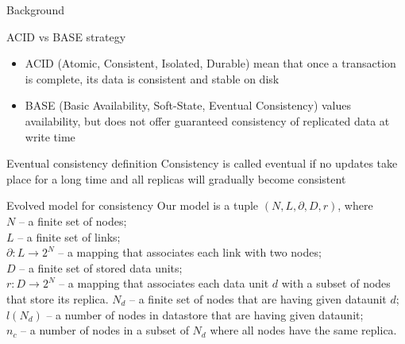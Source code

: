 \documentclass[aspectratio=43]{beamer}
\begin{document}
\begin{frame}{Background}
\begin{block}{ACID vs BASE strategy}
\begin{itemize}
\item ACID (Atomic, Consistent, Isolated, Durable) mean that once a transaction is complete, its data is consistent and stable on disk
\item BASE (Basic Availability, Soft-State, Eventual Consistency) values availability, but 
does not offer guaranteed consistency of replicated data at write time
\end{itemize}

\end{block}

\begin{block}{Eventual consistency definition}
Consistency is called eventual if no updates
take place for a long time and all replicas will gradually become consistent
\end{block}

\end{frame}

\begin{frame}{Evolved model for consistency}
Our model is a tuple $(N, L, \partial,D, r)$, where \\

$N$ -- a finite set of nodes; \\
$L$ -- a finite set of links; \\
$\partial:L\rightarrow 2^N$ -- a mapping that associates each link with two nodes;\\
$D$ -- a finite set of stored data units;\\
$r:D\rightarrow 2^N$ -- a mapping that associates each data unit $d$ with a subset of nodes 
that store its replica.
$N_d$ -- a finite set of nodes that are having given dataunit $d$; \\
$l(N_d)$ -- a number of nodes in datastore that are having given dataunit; \\
$n_c$ -- a number of nodes in a subset of $N_d$ where all nodes have the same replica.

\end{frame}
\end{document}
